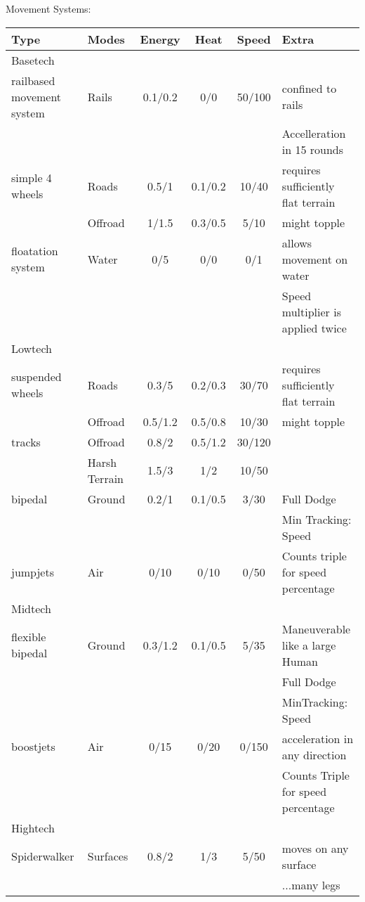 \documentclass{article}
\begin{document}
    Movement Systems:\\
    \begin{tabular}{l|lcccl}
        Type    &Modes &Energy &Heat &Speed &Extra\\
        \hline
        Basetech\\
        railbased movement system & Rails &0.1/0.2&0/0&50/100& confined to rails\\
        &&&&&Accelleration in 15 rounds\\
        simple 4 wheels           & Roads &0.5/1 &0.1/0.2& 10/40 & requires sufficiently flat terrain \\
        & Offroad&1/1.5&0.3/0.5& 5/10 & might topple\\
        floatation system         & Water & 0/5  &  0/0  & 0/1   & allows movement on water\\
        &       &     &       &       & Speed multiplier is applied twice\\
        \hline
        Lowtech\\
        suspended wheels          & Roads &0.3/5 &0.2/0.3& 30/70 & requires sufficiently flat terrain \\
        & Offroad&0.5/1.2&0.5/0.8& 10/30 & might topple\\
        tracks                    & Offroad&0.8/2&0.5/1.2& 30/120 &\\
        & Harsh Terrain&1.5/3&1/2& 10/50 &\\
        bipedal                   & Ground &0.2/1&0.1/0.5& 3/30 & Full Dodge\\
        &&&&&Min Tracking: Speed\\
        jumpjets                  & Air &0/10&0/10&0/50& Counts triple for speed percentage\\
        \hline
        Midtech\\
        flexible bipedal          & Ground &0.3/1.2&0.1/0.5 & 5/35 & Maneuverable like a large Human\\
        &&&&&Full Dodge\\
        &&&&&MinTracking: Speed\\
        boostjets                 & Air &0/15 &0/20&0/150& acceleration in any direction\\
        &&&&&Counts Triple for speed percentage\\
        \hline Hightech\\
        Spiderwalker              & Surfaces &0.8/2 &1/3& 5/50 &moves on any surface\\
        &&&&& ...many legs
    \end{tabular}\\
\end{document}
